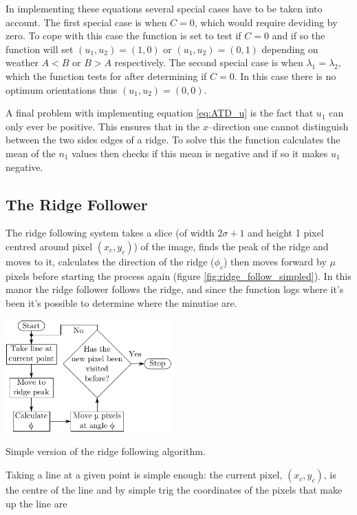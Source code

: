 \documentclass[11pt,a4paper]{article}
\makeatletter
\newenvironment{figurehere}
    {\def\@captype{figure}}
    {}
\makeatother
\begin{document}
\begin{multicols}{2}
		In implementing these equations several special cases have to be taken into account. The first special case is when $C = 0$, which would require deviding by zero. To cope with this case the function is set to test if $C = 0$ and if so the function will set $(u_1, u_2) = (1,0)$ or $(u_1, u_2) = (0,1)$ depending on weather $A < B$ or $B > A$ respectively. The second special case is  when $\lambda_1 = \lambda_2$, which the function tests for after determining if $C = 0$. In this case there is no optimum orientations thus $(u_1, u_2) = (0,0)$.

		A final problem with implementing equation \eqref{eq:ATD_u} is the fact that $u_1$ can only ever be positive. This ensures that in the $x$--direction one cannot distinguish between the two sides edges of a ridge. To solve this the function calculates the mean of the $n_1$ values then checks if this mean is negative and if so it makes $u_1$ negative.

	\subsection{The Ridge Follower}
		The ridge following system takes a slice (of width $2 \sigma + 1$ and height 1 pixel centred around pixel $(x_c, y_c)$) of the image, finds the peak of the ridge and moves to it, calculates the direction of the ridge ($\phi_c$) then moves forward by $\mu$ pixels before starting the process again (figure \ref{fig:ridge_follow_simpled}). In this manor the ridge follower follows the ridge, and since the function logs where it's been it's possible to determine where the minutiae are.

\begin{figurehere}
\centering
\includegraphics[width = 0.48\textwidth]{ridge_follow_simpled}
\caption{Simple version of the ridge following algorithm.}
\label{fig:ridge_follow_simpled}
\end{figurehere}

		Taking a line at a given point is simple enough: the current pixel, $(x_c, y_c)$, is the centre of the line and by simple trig the coordinates of the pixels that make up the line are


\end{multicols}
\end{document}
